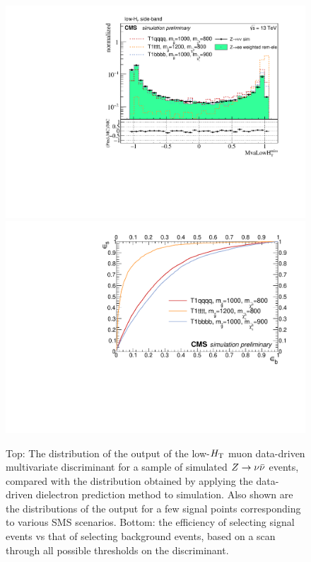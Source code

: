 \begin{figure}[tb!]
\centering
\includegraphics[width=0.7\linewidth]{figures/SusySearches/MvaSusy/MvaLowHt.pdf}
\includegraphics[width=0.7\linewidth]{figures/SusySearches/MvaSusy/RocCurvesLowHt_ZinvVsSUSY.pdf}
\caption{Top: The distribution of the output of the low-$H_{\rm T}$ muon data-driven multivariate discriminant for a sample of simulated $Z\rightarrow \nu\bar{\nu}$ events, compared with the distribution obtained by applying the data-driven dielectron prediction method to simulation. Also shown are the distributions of the output for a few signal points corresponding to various SMS scenarios. Bottom: the efficiency of selecting signal events vs that of selecting background events, based on a scan through all possible thresholds on the discriminant.}
\label{fig:SusyBdt2}
\end{figure}

